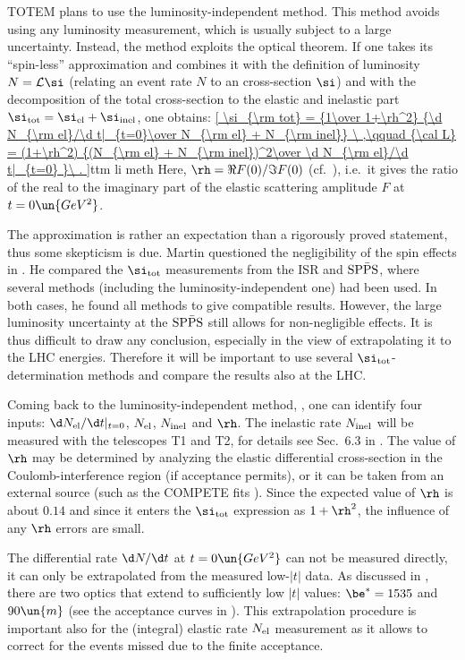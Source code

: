 TOTEM plans to use the luminosity-independent method. This method avoids using any luminosity measurement, which is usually subject to a large uncertainty. Instead, the method exploits the optical theorem. If one takes its ``spin-less'' approximation  and combines it with the definition of luminosity $N = {\cal L} \si$ (relating an event rate $N$ to an cross-section $\si$) and with the decomposition of the total cross-section to the elastic and inelastic part $\si_{\rm tot} = \si_{\rm el} + \si_{\rm inel}$, one obtains:
\eqref{
	\si_{\rm tot} = {1\over 1+\rh^2} {\d N_{\rm el}/\d t|_{t=0}\over N_{\rm el} + N_{\rm inel}}
	\ ,\qquad
	{\cal L} = (1+\rh^2) {(N_{\rm el} + N_{\rm inel})^2\over \d N_{\rm el}/\d t|_{t=0} }\ .
}{ttm li meth}
Here, $\rh = \Re F(0) / \Im F(0)$ (cf.~), i.e.~it gives the ratio of the real to the imaginary part of the elastic scattering amplitude $F$ at $t = 0\un{GeV^2}$.

The approximation  is rather an expectation than a rigorously proved statement, thus some skepticism is due. Martin questioned the negligibility of the spin effects in . He compared the $\si_{\rm tot}$ measurements from the ISR and $\rm SP\bar PS$, where several methods (including the luminosity-independent one) had been used. In both cases, he found all methods to give compatible results. However, the large luminosity uncertainty at the $\rm SP\bar PS$ still allows for non-negligible effects. It is thus difficult to draw any conclusion, especially in the view of extrapolating it to the LHC energies. Therefore it will be important to use several $\si_{\rm tot}$-determination methods and compare the results also at the LHC.

Coming back to the luminosity-independent method, , one can identify four inputs: $\d N_{\rm el}/\d t|_{t=0}$, $N_{\rm el}$, $N_{\rm inel}$ and $\rh$. The inelastic rate $N_{\rm inel}$ will be measured with the telescopes T1 and T2, for details see Sec.~6.3 in . The value of $\rh$ may be determined by analyzing the elastic differential cross-section in the Coulomb-interference region (if acceptance permits), or it can be taken from an external source (such as the COMPETE fits ). Since the expected value of $\rh$ is about $0.14$ and since it enters the $\si_{\rm tot}$ expression as $1 + \rh^2$, the influence of any $\rh$ errors are small.

The differential rate $\d N/\d t$ at $t=0\un{GeV^2}$ can not be measured directly, it can only be extrapolated from the measured low-$|t|$ data. As discussed in , there are two optics that extend to sufficiently low $|t|$ values: $\be^* = 1535$ and $90\un{m}$ (see the acceptance curves in ). This extrapolation procedure is important also for the (integral) elastic rate $N_{\rm el}$ measurement as it allows to correct for the events missed due to the finite acceptance.

